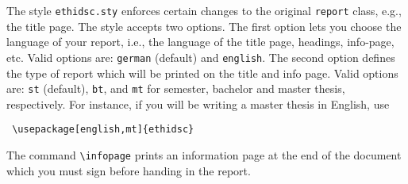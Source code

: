 The style \texttt{ethidsc.sty} enforces certain changes to the original \texttt{report} class, e.g., the title page. The style accepts two options. The first option lets you choose the language of your report, i.e., the language of the title page, headings, info-page, etc. Valid options are: \texttt{german} (default) and \texttt{english}. The second option defines the type of report which will be printed on the title and info page. Valid options are: \texttt{st} (default), \texttt{bt}, and \texttt{mt} for semester, bachelor and master thesis, respectively. For instance, if you will be writing a master thesis in English, use
\begin{verbatim}
 \usepackage[english,mt]{ethidsc}
\end{verbatim}
The command \texttt{\textbackslash infopage} prints an information page at the end of the document which you must sign before handing in the report.

